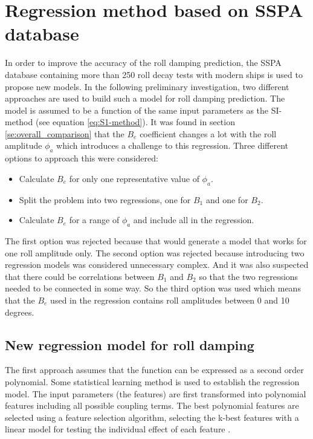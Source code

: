 \section{Regression method based on SSPA database}
\label{se:correction_SI_method}
In order to improve the accuracy of the roll damping prediction, the SSPA database containing more than 250 roll decay tests with modern ships is used to propose new models. In the following preliminary investigation, two different approaches are used to build such a model for roll damping prediction. The model is assumed to be a function of the same input parameters as the SI-method (see equation \ref{eq:S1-method}). It was found in section \ref{se:overall_comparison} that the $B_e$ coefficient changes a lot with the roll amplitude $\phi_a$ which introduces a challenge to this regression. Three different options to approach this were considered:
\begin{itemize}
    \item Calculate $B_e$ for only one representative value of $\phi_a$.
    \item Split the problem into two regressions, one for $B_1$ and one for $B_2$.
    \item Calculate $B_e$ for a range of $\phi_a$ and include all in the regression.
\end{itemize}
The first option was rejected because that would generate a model that works for one roll amplitude only. The second option was rejected because introducing two regression models was considered unnecessary complex. And it was also suspected that there could be correlations between $B_1$ and $B_2$ so that the two regressions needed to be connected in some way. So the third option was used which means that the $B_e$ used in the regression contains roll amplitudes between 0 and 10 degrees.  

\subsection{New regression model for roll damping}
The first approach assumes that the function can be expressed as a second order polynomial. Some statistical learning method is used to establish the regression model. The input parameters (the features) are first transformed into polynomial features including all possible coupling terms. The best polynomial features are selected using a feature selection algorithm, selecting the k-best features \parencite[]{noauthor_sklearnfeature_selectionselectkbest_nodate} with a linear model for testing the individual effect of each feature \parencite[]{noauthor_sklearnfeature_selectionf_regression_nodate}. 

